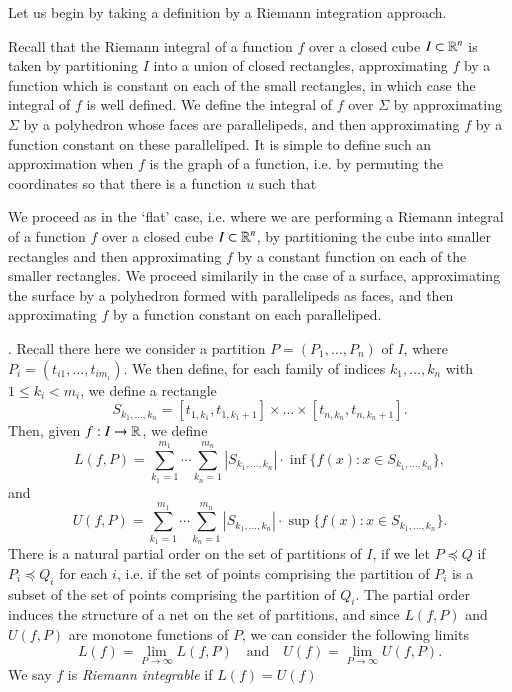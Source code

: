 Let us begin by taking a definition by a Riemann integration approach. 


Recall that the Riemann integral of a function $f$ over a closed cube $I \subset \operatorname{\mathbb{R}}^n$ is taken by partitioning $I$ into a union of closed rectangles, approximating $f$ by a function which is constant on each of the small rectangles, in which case the integral of $f$ is well defined. We define the integral of $f$ over $\Sigma$ by approximating $\Sigma$ by a polyhedron whose faces are parallelipeds, and then approximating $f$ by a function constant on these paralleliped. It is simple to define such an approximation when $f$ is the graph of a function, i.e. by permuting the coordinates so that there is a function $u$ such that 


We proceed as in the `flat' case, i.e. where we are performing a Riemann integral of a function $f$ over a closed cube $I \subset \operatorname{\mathbb{R}}^n$, by partitioning the cube into smaller rectangles and then approximating $f$ by a constant function on each of the smaller rectangles. We proceed similarily in the case of a surface, approximating the surface by a polyhedron formed with parallelipeds as faces, and then approximating $f$ by a function constant on each paralleliped.



. Recall there here we consider a partition $P = (P_1, \dots, P_n)$ of $I$, where $P_i = (t_{i1}, \dots, t_{i m_i})$. We then define, for each family of indices $k_1, \dots, k_n$ with $1 \leq k_i < m_i$, we define a rectangle
%
\[ S_{k_1, \dots, k_n} = [t_{1,k_1}, t_{1,k_1+1}] \times \dots \times [t_{n,k_n}, t_{n,k_n+1}]. \]
%
Then, given $f: I \to \operatorname{\mathbb{R}}$, we define
%
\[ L(f,P) = \sum_{k_1 = 1}^{m_1} \cdots \sum_{k_n = 1}^{m_n} |S_{k_1, \dots, k_n}| \cdot \inf \{ f(x) : x \in S_{k_1, \dots, k_n} \}, \]
%
and
%
\[ U(f,P) = \sum_{k_1 = 1}^{m_1} \cdots \sum_{k_n = 1}^{m_n} |S_{k_1, \dots, k_n}| \cdot \sup \{ f(x) : x \in S_{k_1, \dots, k_n} \}. \]
%
There is a natural partial order on the set of partitions of $I$, if we let $P \preceq Q$ if $P_i \preceq Q_i$ for each $i$, i.e. if the set of points comprising the partition of $P_i$ is a subset of the set of points comprising the partition of $Q_i$. The partial order induces the structure of a net on the set of partitions, and since $L(f,P)$ and $U(f,P)$ are monotone functions of $P$, we can consider the following limits
%
\[ L(f) = \lim_{P \to \infty} L(f,P) \quad\text{and}\quad U(f) = \lim_{P \to \infty} U(f,P). \]
%
We say $f$ is \emph{Riemann integrable} if $L(f) = U(f)$

